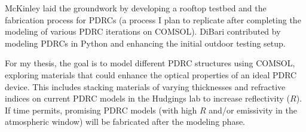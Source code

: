 McKinley laid the groundwork by developing a rooftop testbed and the fabrication process for PDRCs (a process I plan to replicate after completing the modeling of various PDRC iterations on COMSOL). DiBari contributed by modeling PDRCs in Python and enhancing the initial outdoor testing setup.

For my thesis, the goal is to model different PDRC structures using COMSOL, exploring materials that could enhance the optical properties of an ideal PDRC device. This includes stacking materials of varying thicknesses and refractive indices on current PDRC models in the Hudgings lab to increase reflectivity ($R$). If time permits, promising PDRC models (with high $R$ and/or emissivity in the atmospheric window) will be fabricated after the modeling phase.
